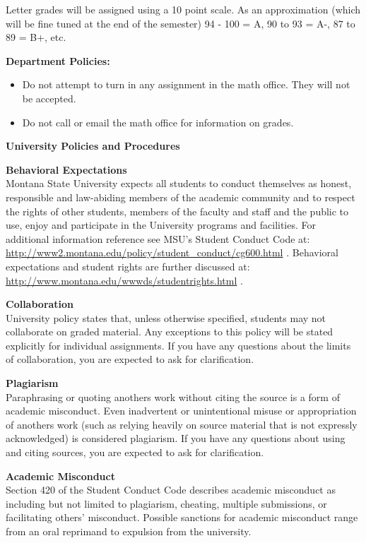   Letter grades will be assigned using a 10 point scale.
  As an approximation (which will be fine tuned at the end of the semester)
  94 - 100 = A,  90 to 93 = A-, 87 to 89 = B+, etc.
 
{\bf Department Policies:}\vspace{-.2in}
\begin{itemize}
\item Do not attempt to turn in any assignment in the math
  office. They will not be accepted.
\item Do not call or email the math office for information on grades.
\end{itemize}

\begin{center}
{\large\bf University Policies and Procedures }  
\end{center}

{\bf Behavioral Expectations }\\
Montana State University expects all students to conduct themselves as
honest, responsible and law-abiding members of the academic community
and to respect the rights of other students, members of the faculty
and staff and the public to use, enjoy and participate in the
University programs and facilities. For additional information
reference see MSU's Student Conduct Code at: 
\url{http://www2.montana.edu/policy/student_conduct/cg600.html} .
Behavioral expectations and student rights are further discussed at:
\url{http://www.montana.edu/wwwds/studentrights.html} . 
 

 {\bf Collaboration }\\
University policy states that, unless otherwise specified, students
may not collaborate on graded material. Any exceptions to this policy
will be stated explicitly for individual assignments. If you have any
questions about the limits of collaboration, you are expected to ask
for clarification. 


 {\bf Plagiarism  }\\
Paraphrasing or quoting anothers work without citing the source is a
form of academic misconduct. Even inadvertent or unintentional misuse
or appropriation of anothers work (such as relying heavily on source
material that is not expressly acknowledged) is considered
plagiarism. If you have any questions about using and citing sources,
you are expected to ask for clarification. 

 {\bf Academic Misconduct  }\\
Section 420 of the Student Conduct Code describes academic misconduct
as including but not limited to plagiarism, cheating, multiple
submissions, or facilitating others’ misconduct. Possible sanctions
for academic misconduct range from an oral reprimand to expulsion from
the university. 

